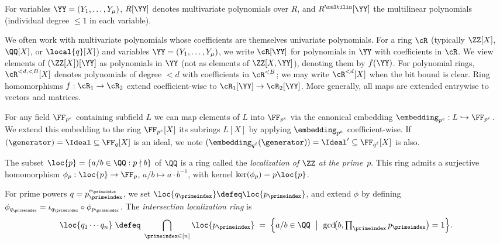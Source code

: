 For variables $\YY=(Y_1,\ldots, Y_\mu)$, $R[\YY]$ denotes multivariate polynomials over $R$, and $R^{\multilin}[\YY]$ the multilinear polynomials (individual degree $\le 1$ in each variable).

We often work with multivariate polynomials whose coefficients are themselves univariate polynomials. For a ring $\cR$ (typically $\ZZ[X]$, $\QQ[X]$, or $\local{q}[X]$) and variables $\YY=(Y_1,\ldots, Y_\mu)$, we write $\cR[\YY]$ for polynomials in $\YY$ with coefficients in $\cR$. We view elements of $(\ZZ[X])[\YY]$ as polynomials in $\YY$ (not as elements of $\ZZ[X,\YY]$), denoting them by $f(\YY)$.
For polynomial rings, $\cR^{<d, <B}[X]$ denotes polynomials of degree $<d$ with coefficients in $\cR^{<B}$; we may write $\cR^{<d}[X]$ when the bit bound is clear.
Ring homomorphisms $f:\cR_1 \to \cR_2$ extend coefficient-wise to $\cR_1[\YY] \to \cR_2[\YY]$.
More generally, all maps are extended entrywise to vectors and matrices.


For any field $\FF_{p^e}$ containing subfield $L$ we can map elements of $L$ into $\FF_{p^e}$ via the canonical embedding $\embedding_{p^{e}}: L \hookrightarrow \FF_{p^e}$. We extend this embedding to the ring $\FF_{p^e}[X]$ its subrings $L[X]$ by applying $\embedding_{p^{e}}$ coefficient-wise. If $(\generator) = \Ideal \subseteq \FF_q[X]$ is an ideal, we note $(\embedding_{q^\ell}(\generator)) = \Ideal' \subseteq \FF_{q^\ell}[X]$ is also.%



\label{sec:zinc-local-rings}
The subset $\loc{p} = \{a/b\in \QQ : p\nmid b\}$ of $\QQ$ is a ring called the \emph{localization of $\ZZ$ at the prime~$p$}. This ring admits a surjective homomorphism $\phi_p: \loc{p} \to \FF_p$, $a/b \mapsto a \cdot b^{-1}$, with kernel $\ker(\phi_p) = p\loc{p}$.


For prime powers $q=p_\primeindex^{e_\primeindex}$, we set $\loc{q_\primeindex}\defeq \loc{p_\primeindex}$, and extend $\phi$ by defining $\phi_{q_\primeindex} = \iota_{q_\primeindex} \circ \phi_{p_\primeindex}$. The \emph{intersection localization ring} is
\begin{equation}\label{e: multi_localization}
\loc{q_1\cdots q_{n}}
\;\defeq\;\bigcap_{\primeindex\in[n]}\loc{p_\primeindex}
\;=\;
\Bigl\{a/b\in \QQ \ \bigm|\ \gcd\!\bigl(b,\textstyle\prod_{\primeindex} p_\primeindex\bigr)=1\Bigr\}.
\end{equation}


